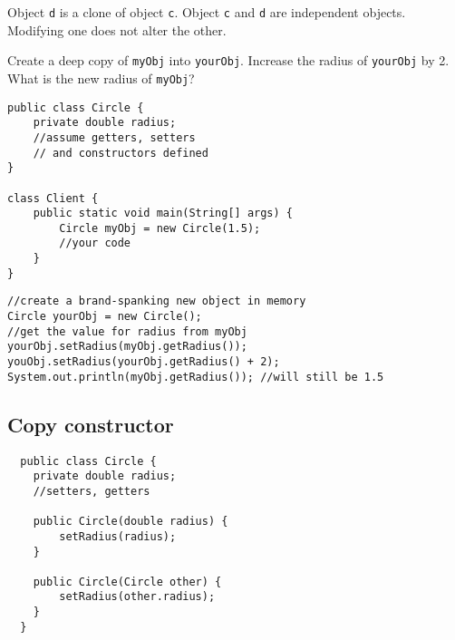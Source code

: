   Object \texttt{d} is a clone of object \texttt{c}. Object \texttt{c} and \texttt{d} are independent objects. Modifying one does not alter the other.

\begin{center}
\end{center}

  
\begin{exercise}
Create a deep copy of \texttt{myObj} into \texttt{yourObj}. Increase the radius of \texttt{yourObj} by 2. What is the new radius of \texttt{myObj}?

\begin{lstlisting}[frame=single,style=buggy]
public class Circle {
	private double radius;
	//assume getters, setters
	// and constructors defined
}

class Client {
	public static void main(String[] args) {
		Circle myObj = new Circle(1.5);
		//your code
	}
}
\end{lstlisting}  	
\end{exercise}

\begin{answer} \begin{lstlisting}
//create a brand-spanking new object in memory
Circle yourObj = new Circle(); 
//get the value for radius from myObj
yourObj.setRadius(myObj.getRadius());
youObj.setRadius(yourObj.getRadius() + 2);
System.out.println(myObj.getRadius()); //will still be 1.5
\end{lstlisting} \end{answer}

\clearpage
\subsection{Copy constructor}
  \begin{lstlisting}
  public class Circle {
  	private double radius;
  	//setters, getters
 
  	public Circle(double radius) {
		setRadius(radius);
  	}
	
	public Circle(Circle other) {
		setRadius(other.radius);
  	}
  }
  \end{lstlisting}   
  
